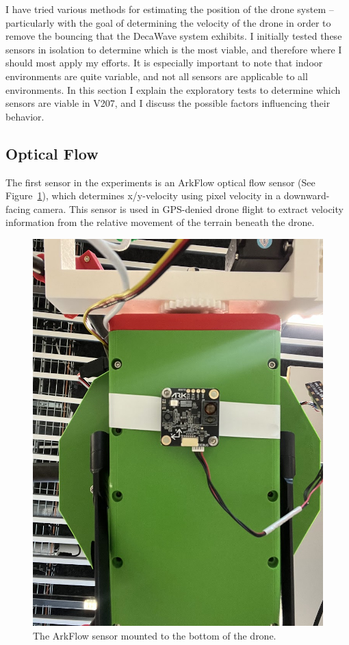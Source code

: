 I have tried various methods for estimating the position of the drone system
-- particularly with the goal of determining the velocity of the drone in order to remove the bouncing
that the DecaWave system exhibits.
I initially tested these sensors in isolation to determine which is the most viable,
and therefore where I should most apply my efforts.
It is especially important to note that indoor environments are quite variable,
and not all sensors are applicable to all environments.
In this section I explain the exploratory tests to determine which sensors are viable in V207,
and I discuss the possible factors influencing their behavior.

\subsection{Optical Flow}

The first sensor in the experiments is an ArkFlow optical flow sensor (See Figure~\ref{figure:arkflow_mount}),
which determines x/y-velocity using pixel velocity in a downward-facing camera.
This sensor is used in GPS-denied drone flight to extract velocity information from the
relative movement of the terrain beneath the drone.

\begin{figure}
	\centering
	\includegraphics[width=0.5\linewidth]{./images/arkflow_mount}
	\caption{The ArkFlow sensor mounted to the bottom of the drone.}
	\label{figure:arkflow_mount}
\end{figure}

